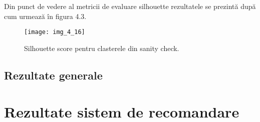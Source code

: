 Din punct de vedere al metricii de evaluare silhouette rezultatele se prezintă după cum urmează în figura 4.3.
\begin{figure}[!h]
	\centering
	\texttt{[image: img\_4\_16]}
	\caption[Silhouette score pentru clasterele din sanity check]{Silhouette score pentru clasterele din sanity check.}
\end{figure} 

\subsection{Rezultate generale}

\section{Rezultate sistem de recomandare}
